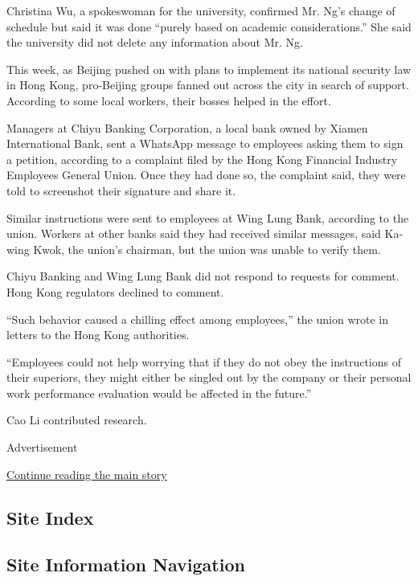 Christina Wu, a spokeswoman for the university, confirmed Mr. Ng's
change of schedule but said it was done ``purely based on academic
considerations.'' She said the university did not delete any information
about Mr. Ng.

This week, as Beijing pushed on with plans to implement its national
security law in Hong Kong, pro-Beijing groups fanned out across the city
in search of support. According to some local workers, their bosses
helped in the effort.

Managers at Chiyu Banking Corporation, a local bank owned by Xiamen
International Bank, sent a WhatsApp message to employees asking them to
sign a petition, according to a complaint filed by the Hong Kong
Financial Industry Employees General Union. Once they had done so, the
complaint said, they were told to screenshot their signature and share
it.

Similar instructions were sent to employees at Wing Lung Bank, according
to the union. Workers at other banks said they had received similar
messages, said Ka-wing Kwok, the union's chairman, but the union was
unable to verify them.

Chiyu Banking and Wing Lung Bank did not respond to requests for
comment. Hong Kong regulators declined to comment.

``Such behavior caused a chilling effect among employees,'' the union
wrote in letters to the Hong Kong authorities.

``Employees could not help worrying that if they do not obey the
instructions of their superiors, they might either be singled out by the
company or their personal work performance evaluation would be affected
in the future.''

Cao Li contributed research.

Advertisement

\protect\hyperlink{after-bottom}{Continue reading the main story}

\hypertarget{site-index}{%
\subsection{Site Index}\label{site-index}}

\hypertarget{site-information-navigation}{%
\subsection{Site Information
Navigation}\label{site-information-navigation}}

